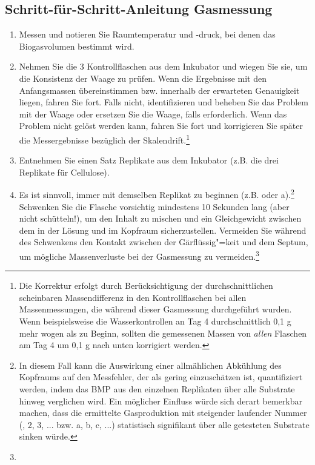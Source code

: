 \documentclass[]{article}
\begin{document}
\subsection{Schritt-für-Schritt-Anleitung Gasmessung}
\label{sec:steps}
\begin{enumerate}
    \item Messen und notieren Sie Raumtemperatur und  -druck, bei denen das Biogasvolumen bestimmt wird.
    \item Nehmen Sie die 3 Kontrollflaschen aus dem Inkubator und wiegen Sie sie, um die Konsistenz der Waage zu prüfen.
      Wenn die Ergebnisse mit den Anfangsmassen übereinstimmen bzw. innerhalb der erwarteten Genauigkeit liegen, fahren Sie fort. Falls nicht, identifizieren und beheben Sie das Problem mit der Waage oder ersetzen Sie die Waage, falls erforderlich.
      Wenn das Problem nicht gelöst werden kann, fahren Sie fort und korrigieren Sie später die Messergebnisse bezüglich der Skalendrift.\footnote{
        Die Korrektur erfolgt durch Berücksichtigung der durchschnittlichen scheinbaren Massendifferenz in den Kontrollflaschen bei allen Massenmessungen, die während dieser Gasmessung durchgeführt wurden.
        Wenn beispielsweise die Wasserkontrollen an Tag 4 durchschnittlich 0,1 g mehr wogen als zu Beginn, sollten die gemessenen Massen von \textit{allen} Flaschen am Tag 4 um 0,1 g nach unten korrigiert werden.
      }
    \item Entnehmen Sie einen Satz Replikate aus dem Inkubator (z.B. die drei Replikate für Cellulose).
    \item Es ist sinnvoll, immer mit demselben Replikat zu beginnen (z.B. \grqq{} oder \glqq a\grqq{}).\footnote{
        In diesem Fall kann die Auswirkung einer allmählichen Abkühlung des Kopfraums auf den Messfehler, der als gering einzuschätzen ist, quantifiziert werden, indem das BMP aus den einzelnen Replikaten über alle Substrate hinweg verglichen wird. Ein möglicher Einfluss würde sich derart bemerkbar machen, dass die ermittelte Gasproduktion mit steigender laufender Nummer (, 2, 3, ...\grqq{} bzw. \glqq a, b, c, ...\grqq{}) statistisch signifikant über alle getesteten Substrate sinken würde.}
        Schwenken Sie die Flasche vorsichtig mindestens 10 Sekunden lang (aber nicht schütteln!), um den Inhalt zu mischen und ein Gleichgewicht zwischen dem  in der Lösung und im Kopfraum sicherzustellen.
      Vermeiden Sie während des Schwenkens den Kontakt zwischen der Gärflüssig"=keit und dem Septum, um mögliche Massenverluste bei der Gasmessung zu vermeiden.\footnote{
}
\end{enumerate}
\end{document}
